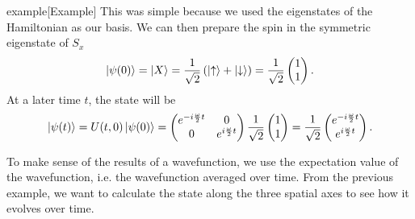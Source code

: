 \documentclass{article}
\begin{document}
\begin{callout}{example}[Example]
This was simple because we used the eigenstates of the Hamiltonian as our basis. We can then prepare the spin in the symmetric eigenstate of $S_x$
\[
    \ket{\psi (0)}=\ket{X}=\frac{1}{\sqrt{2}}\left( \ket{\uparrow}+\ket{\downarrow} \right)=\frac{1}{\sqrt{2}}\begin{pmatrix}
        1 \\ 1
    \end{pmatrix}.
\]
At a later time $t$, the state will be
\[
    \ket{\psi (t)}=U(t,0)\ket{\psi (0)}=\begin{pmatrix}
        e^{-i \frac{\omega }{2}t} & 0 \\
        0 & e^{i \frac{\omega }{2}t}
    \end{pmatrix}\frac{1}{\sqrt{2}}\begin{pmatrix}
        1 \\ 1
    \end{pmatrix} = \frac{1}{\sqrt{2}}\begin{pmatrix}
        e^{-i \frac{\omega }{2}t} \\ e^{i \frac{\omega }{2}t}
    \end{pmatrix}.
\]
\end{callout}

To make sense of the results of a wavefunction, we use the expectation value of the wavefunction, i.e. the wavefunction averaged over time. From the previous example, we want to calculate the state along the three spatial axes to see how it evolves over time.
\end{document}
